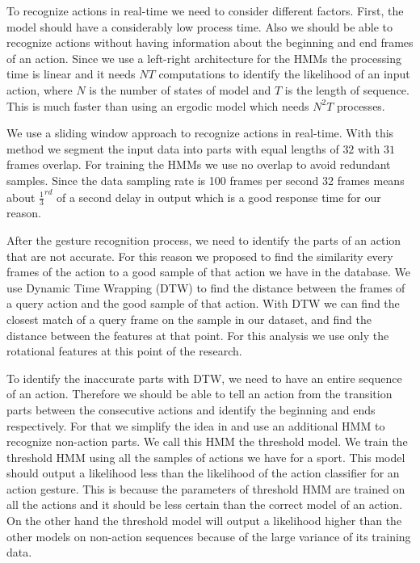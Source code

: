 To recognize actions in real-time we need to consider different factors. First, the model should have a considerably low process time. Also we should be able to recognize actions without having information about the beginning and end frames of an action. Since we use a left-right architecture for the HMMs the processing time is linear and it needs $NT$ computations to identify the likelihood of an input action, where $N$ is the number of states of model and $T$ is the length of sequence. This is much faster than using an ergodic model which needs $N^2T$ processes.

We use a sliding window approach to recognize actions in real-time. With this method we segment the input data into parts with equal lengths of $32$ with $31$ frames overlap. For training the HMMs we use no overlap to avoid redundant samples. Since the data sampling rate is 100 frames per second 32 frames means about $\frac{1}{3}^{rd}$ of a second delay in output which is a good response time for our reason.

After the gesture recognition process, we need to identify the parts of an action that are not accurate. For this reason we proposed to find the similarity every frames of the action to a good sample of that action we have in the database. We use Dynamic Time Wrapping (DTW) to find the distance between the frames of a query action and the good sample of that action. With DTW we can find the closest match of a query frame on the sample in our dataset, and find the distance between the features at that point. For this analysis we use only the rotational features at this point of the research.

To identify the inaccurate parts with DTW, we need to have an entire sequence of an action. Therefore we should be able to tell an action from the transition parts between the consecutive actions and identify the beginning and ends respectively. For that we simplify the idea in \cite{lee1999hmm} and use an additional HMM to recognize non-action parts. We call this HMM the threshold model. We train the threshold HMM using all the samples of actions we have for a sport. This model should output a likelihood less than the likelihood of the action classifier for an action gesture. This is because the parameters of threshold HMM are trained on all the actions and it should be less certain than the correct model of an action. On the other hand the threshold model will output a likelihood higher than the other models on non-action sequences because of the large variance of its training data. 